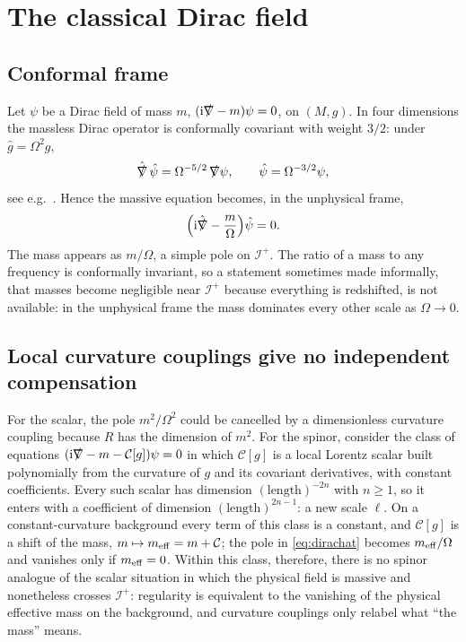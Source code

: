 \documentclass[11pt,a4paper]{article}
\theoremstyle{definition}
\newcommand{\scri}{\mathscr{I}^{+}}
\newcommand{\ii}{\mathrm{i}}
\newcommand{\hg}{\hat g}
\newcommand{\hpsi}{\hat\psi}
\begin{document}
\section{The classical Dirac field}
\label{sec:dirac}

\subsection{Conformal frame}

Let $\psi$ be a Dirac field of mass $m$, $(\ii\slashed{\nabla}-m)\psi=0$, on $(M,g)$. In four dimensions the massless Dirac operator is conformally covariant with weight $3/2$: under $\hg=\Omega^{2}g$,
\begin{equation}
\hat{\slashed\nabla}\,\hpsi=\Omega^{-5/2}\,\slashed\nabla\psi,\qquad \hpsi=\Omega^{-3/2}\psi,
\end{equation}
see e.g.\ \cite{BirrellDavies,ParkerToms}. Hence the massive equation becomes, in the unphysical frame,
\begin{equation}
\Big(\ii\hat{\slashed\nabla}-\frac{m}{\Omega}\Big)\hpsi=0 .
\label{eq:dirachat}
\end{equation}
The mass appears as $m/\Omega$, a simple pole on $\scri$. The ratio of a mass to any frequency is conformally invariant, so a statement sometimes made informally, that masses become negligible near $\scri$ because everything is redshifted, is not available: in the unphysical frame the mass dominates every other scale as $\Omega\to0$.

\subsection{Local curvature couplings give no independent compensation}
\label{sec:nocoupling}

For the scalar, the pole $m^{2}/\Omega^{2}$ could be cancelled by a dimensionless curvature coupling because $R$ has the dimension of $m^{2}$. For the spinor, consider the class of equations $(\ii\slashed\nabla-m-\mathcal{C}[g])\psi=0$ in which $\mathcal{C}[g]$ is a local Lorentz scalar built polynomially from the curvature of $g$ and its covariant derivatives, with constant coefficients. Every such scalar has dimension $(\text{length})^{-2n}$ with $n\ge1$, so it enters with a coefficient of dimension $(\text{length})^{2n-1}$: a new scale $\ell$. On a constant-curvature background every term of this class is a constant, and $\mathcal{C}[g]$ is a shift of the mass, $m\mapsto m_{\rm eff}=m+\mathcal{C}$; the pole in \eqref{eq:dirachat} becomes $m_{\rm eff}/\Omega$ and vanishes only if $m_{\rm eff}=0$. Within this class, therefore, there is no spinor analogue of the scalar situation in which the physical field is massive and nonetheless crosses $\scri$: regularity is equivalent to the vanishing of the physical effective mass on the background, and curvature couplings only relabel what ``the mass'' means.
\end{document}
